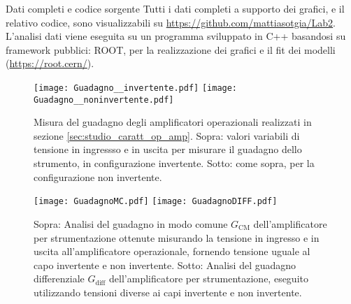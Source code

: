 \documentclass[
    rmp,
    reprint, 
    superscriptaddress, 
    altaffilletter, 
    amsmath, 
    amssymb,
    a4paper]{revtex4-2}
\begin{document}
\begin{methods}{D\lowercase{ati completi e codice sorgente}}
    Tutti i dati completi a supporto dei grafici, e il relativo codice, sono visualizzabili su \url{https://github.com/mattiasotgia/Lab2}. L'analisi dati viene eseguita su un programma sviluppato in C++ basandosi su framework pubblici: ROOT, per la realizzazione dei grafici e il fit dei modelli (\url{https://root.cern/}).
\end{methods}

\appendix

\renewcommand{\thetable}{S-\arabic{table}}
\renewcommand{\thefigure}{S-\arabic{figure}}
\begin{figure*}[p]
    \raggedright
    \texttt{[image: Guadagno\_\_invertente.pdf]}
    \texttt{[image: Guadagno\_\_noninvertente.pdf]}
    \caption{Misura del guadagno degli amplificatori operazionali realizzati in sezione \ref{sec:studio_caratt_op_amp}. Sopra: valori variabili di tensione in ingressso e in uscita per misurare il guadagno dello strumento, in configurazione invertente. Sotto: come sopra, per la configurazione non invertente.}
    \label{fig:guadagno_inv_noninv}
\end{figure*}
\begin{figure*}
    \raggedright
    \texttt{[image: GuadagnoMC.pdf]}
    \texttt{[image: GuadagnoDIFF.pdf]}
    \caption{Sopra: Analisi del guadagno in modo comune $G_{\text{CM}}$ dell'amplificatore per strumentazione ottenute misurando la tensione in ingresso e in uscita all'amplificatore operazionale, fornendo tensione uguale al capo invertente e non invertente. Sotto: Analisi del guadagno differenziale $G_{\text{diff}}$ dell'amplificatore per strumentazione, eseguito utilizzando tensioni diverse ai capi invertente e non invertente.}
    \label{fig:guadagno_op_amp_strum}
\end{figure*}
\end{document}

